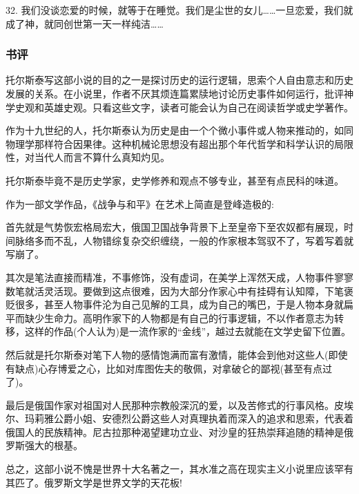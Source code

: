32. 我们没谈恋爱的时候，就等于在睡觉。我们是尘世的女儿……一旦恋爱，我们就成了神，就同创世第一天一样纯洁……

\subsubsection{书评}
托尔斯泰写这部小说的目的之一是探讨历史的运行逻辑，思索个人自由意志和历史发展的关系。在小说里，作者不厌其烦连篇累牍地讨论历史事件如何运行，批评神学史观和英雄史观。只看这些文字，读者可能会认为自己在阅读哲学或史学著作。

作为十九世纪的人，托尔斯泰认为历史是由一个个微小事件或人物来推动的，如同物理学那样符合因果律。这种机械论思想没有超出那个年代哲学和科学认识的局限性，对当代人而言不算什么真知灼见。

托尔斯泰毕竟不是历史学家，史学修养和观点不够专业，甚至有点民科的味道。

作为一部文学作品，《战争与和平》在艺术上简直是登峰造极的:

首先就是气势恢宏格局宏大，俄国卫国战争背景下上至皇帝下至农奴都有展现，时间脉络多而不乱，人物错综复杂交织缠绕，一般的作家根本驾驭不了，写着写着就写崩了。

其次是笔法直接而精准，不事修饰，没有虚词，在美学上浑然天成，人物事件寥寥数笔就活灵活现。要做到这点很难，因为大部分作家心中有挂碍有认知障，下笔褒贬很多，甚至人物事件沦为自己见解的工具，成为自己的嘴巴，于是人物本身就扁平而缺少生命力。高明作家下的人物都是有自己的行事逻辑，不以作者意志为转移，这样的作品(个人认为)是一流作家的“金线”，越过去就能在文学史留下位置。

然后就是托尔斯泰对笔下人物的感情饱满而富有激情，能体会到他对这些人(即使有缺点)心存博爱之心，比如对库图佐夫的敬佩，对拿破仑的鄙视(甚至有点过了)。

最后是俄国作家对祖国对人民那种宗教般深沉的爱，以及苦修式的行事风格。皮埃尔、玛莉雅公爵小姐、安德烈公爵这些人对真理执着而深入的追求和思索，代表着俄国人的民族精神。尼古拉那种渴望建功立业、对沙皇的狂热崇拜追随的精神是俄罗斯强大的根基。

总之，这部小说不愧是世界十大名著之一，其水准之高在现实主义小说里应该罕有其匹了。俄罗斯文学是世界文学的天花板!